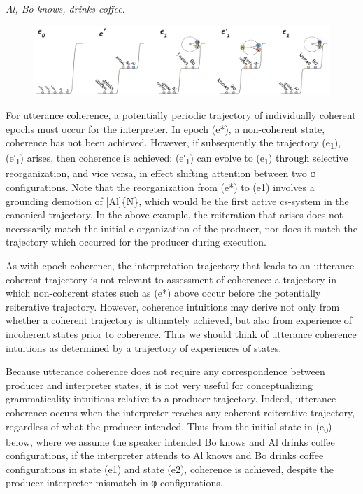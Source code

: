 \textit{Al, Bo knows, drinks coffee}.

  
\begin{figure}
\includegraphics[width=\textwidth]{figures/Tilsen-img125.png}
\caption{\missingcaption}
\label{fig:6:6}
\end{figure}
 

  For utterance coherence, a potentially periodic trajectory of individually coherent epochs must occur for the interpreter. In epoch (e*), a non-coherent state, coherence has not been achieved. However, if subsequently the trajectory (e\textsubscript{1}), (e′\textsubscript{1}) arises, then coherence is achieved: (e′\textsubscript{1}) can evolve to (e\textsubscript{1}) through selective reorganization, and vice versa, in effect shifting attention between two φ configurations. Note that the reorganization from (e*) to (e1) involves a grounding demotion of [Al]\{N\}, which would be the first active cs-system in the canonical trajectory. In the above example, the reiteration that arises does not necessarily match the initial e-organization of the producer, nor does it match the trajectory which occurred for the producer during execution.

  As with epoch coherence, the interpretation trajectory that leads to an utterance-coherent trajectory is not relevant to assessment of coherence: a trajectory in which non-coherent states such as (e*) above occur before the potentially reiterative trajectory. However, coherence intuitions may derive not only from whether a coherent trajectory is ultimately achieved, but also from experience of incoherent states prior to coherence. Thus we should think of utterance coherence intuitions as determined by a trajectory of experiences of states.

  Because utterance coherence does not require any correspondence between producer and interpreter states, it is not very useful for conceptualizing grammaticality intuitions relative to a producer trajectory. Indeed, utterance coherence occurs when the interpreter reaches any coherent reiterative trajectory, regardless of what the producer intended. Thus from the initial state in (e\textsubscript{0}) below, where we assume the speaker intended {\textbar}Bo knows{\textbar} and {\textbar}Al drinks coffee{\textbar} configurations, if the interpreter attends to {\textbar}Al knows{\textbar} and {\textbar}Bo drinks coffee{\textbar} configurations in state (e1) and state (e2), coherence is achieved, despite the producer-interpreter mismatch in φ configurations.

